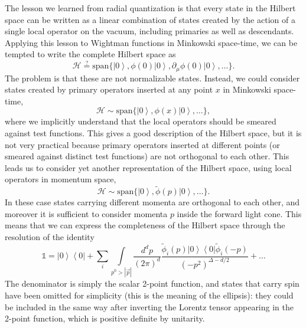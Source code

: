 \documentclass[a4paper,12pt]{article}
\newcommand{\ket}[1]{\left| #1 \right\rangle}
\newcommand{\bra}[1]{\left\langle #1 \right|}
\numberwithin{equation}{section}
\begin{document}
The lesson we learned from radial quantization is that every state in the Hilbert space can be written as a linear combination of states created by the action of a single local operator on the vacuum, including primaries as well as descendants. Applying this lesson to Wightman functions in Minkowski space-time, we can be tempted to write the complete Hilbert space as
\begin{equation}
	\mathscr{H} \stackrel{?}{=} \text{span}\big\{
	\ket{0}, 
	\phi(0) \ket{0}, 
	\partial_\mu \phi(0) \ket{0}, 
	\ldots
	\big\}.
	\label{eq:localstates}
\end{equation}
The problem is that these are not normalizable states. Instead, we could consider states created by primary operators inserted at any point $x$ in Minkowski space-time,
\begin{equation}
	\mathscr{H} \sim \text{span}\big\{
	\ket{0}, 
	\phi(x) \ket{0}, 
	\ldots
	\big\},
\end{equation}
where we implicitly understand that the local operators should be smeared against test functions. This gives a good description of the Hilbert space, but it is not very practical because primary operators inserted at different points (or smeared against distinct test functions) are not orthogonal to each other.
This leads us to consider yet another representation of the Hilbert space, using local operators in momentum space,
\begin{equation}
	\mathscr{H} \sim \text{span}\big\{
	\ket{0}, 
	\widetilde{\phi}(p) \ket{0}, 
	\ldots
	\big\}.
\end{equation}
In these case states carrying different momenta are orthogonal to each other, and moreover it is sufficient to consider momenta $p$ inside the forward light cone.
This means that we can express the completeness of the Hilbert space through the resolution of the identity
\begin{equation}
	\mathds{1} = \ket{0} \bra{0}
	+ \sum_i \int\limits_{p^0 > \left| \vec{p} \right|} \!\! 
	\frac{d^dp}{(2\pi)^d}
	\frac{\widetilde{\phi}_i(p) \ket{0} \bra{0} \widetilde{\phi}_i(-p) }
	{(-p^2)^{\Delta - d/2}}
	+ \ldots
\end{equation}
The denominator is simply the scalar 2-point function, and states that carry spin have been omitted for simplicity (this is the meaning of the ellipsis): they could be included in the same way after inverting the  Lorentz tensor appearing in the 2-point function, which is positive definite by unitarity.
\end{document}
